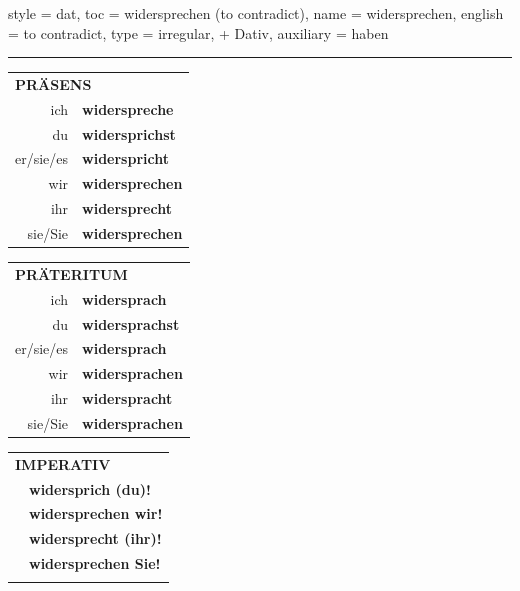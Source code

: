 \begin{verbentry}{
  style = {dat},
  toc = {widersprechen (to contradict)},
  name = {widersprechen},
  english = {to contradict},
  type = {irregular, + Dativ},
  auxiliary = {haben}
}
 
    
     \vspace{5pt}

    \hrule
    
    \vspace{5pt}

  \begin{tabular}{rl}
     \multicolumn{2}{l}{\textbf{PRÄSENS} }\\
    ich & \textbf{widerspreche}\\
    du & \textbf{widersprichst}\\
    er/sie/es & \textbf{widerspricht}\\
    wir & \textbf{widersprechen}\\
    ihr & \textbf{widersprecht}\\
    sie/Sie & \textbf{widersprechen}\\
  \end{tabular}
  \hfill
     \begin{tabular}{rl}
    \multicolumn{2}{l}{\textbf{PRÄTERITUM} }\\
    ich & \textbf{widersprach}\\
    du & \textbf{widersprachst}\\
    er/sie/es & \textbf{widersprach}\\
    wir & \textbf{widersprachen}\\
    ihr & \textbf{widerspracht}\\
    sie/Sie & \textbf{widersprachen}\\
  \end{tabular}
  \hfill
  \begin{tabular}{rl}
     \multicolumn{2}{l}{\textbf{IMPERATIV} }\\
   & \textbf{widersprich (du)!}\\
   & \textbf{widersprechen wir!}\\
   & \textbf{widersprecht (ihr)!}\\
   & \textbf{widersprechen Sie!}\\
   & \vspace{10pt}
  \end{tabular}

    \vspace{10pt}


\end{verbentry}
